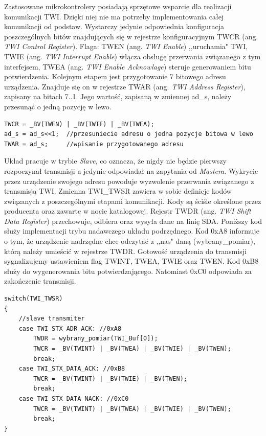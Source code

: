 Zastosowane mikrokontrolery posiadają sprzętowe wsparcie dla realizacji komunikacji TWI. Dzięki niej nie ma potrzeby implementowania całej komunikacji od podstaw. Wystarczy jedynie odpowiednia konfiguracja poszczególnych bitów znajdujących się w rejestrze konfiguracyjnym TWCR (ang. \textit{TWI Control Register})\cite{nota}. Flaga: TWEN (ang. \textit{TWI Enable}) ,,uruchamia" TWI, TWIE (ang. \textit{TWI Interrupt Enable}) włącza obsługę przerwania związanego z tym interfejsem, TWEA (ang. \textit{TWI Enable Acknowlage}) steruje generowaniem bitu potwierdzenia. Kolejnym etapem jest przygotowanie 7 bitowego adresu urządzenia. Znajduje się on w rejestrze TWAR (ang. \textit{TWI Address Register}), zapisany na bitach 7..1. Jego wartość, zapisaną w zmiennej ad\_s, należy przesunąć o jedną pozycję w lewo. 
\begin{lstlisting}[caption=Uruchomienie interfejsu TWI oraz przypisanie adresu urządzenia]
TWCR = _BV(TWEN) | _BV(TWIE) | _BV(TWEA);
ad_s = ad_s<<1;  //przesuniecie adresu o jedna pozycje bitowa w lewo
TWAR = ad_s;     //wpisanie przygotowanego adresu
\end{lstlisting}
Układ pracuje w trybie \textit{Slave}, co oznacza, że nigdy nie będzie pierwszy rozpoczynał transmisji a jedynie odpowiadał na zapytania od \textit{Mastera}. Wykrycie przez urządzenie swojego adresu powoduje wyzwolenie przerwania związanego z transmisją TWI. Zmienna TWI\_TWSR zawiera w sobie definicje kodów związanych z poszczególnymi etapami komunikacji. Kody są ściśle określone przez producenta oraz zawarte w nocie katalogowej\cite{nota}. Rejestr TWDR (ang. \textit{TWI Shift Data Register}) przechowuje, odbiera oraz wysyła dane na linię SDA. Poniższy kod służy implementacji trybu nadawczego układu podrzędnego. Kod 0xA8 informuje o tym, że urządzenie nadrzędne chce odczytać z ,,nas" daną (wybrany\_pomiar), którą należy umieścić w rejestrze TWDR. Gotowość urządzenia do transmisji sygnalizujemy ustawieniem flag TWINT, TWEA, TWIE oraz TWEN. Kod 0xB8 służy do wygenerowania bitu potwierdzającego. Natomiast 0xC0 odpowiada za zakończenie transmisji.
\begin{lstlisting}[caption={Fragment przerwania obsługującego komunikację TWI, który jest odpowiedzialny za wysłanie wskazanego bajtu}]
switch(TWI_TWSR)
{
	//slave transmiter
	case TWI_STX_ADR_ACK: //0xA8
		TWDR = wybrany_pomiar(TWI_Buf[0]);
		TWCR = _BV(TWINT) | _BV(TWEA) | _BV(TWIE) | _BV(TWEN);
		break;
	case TWI_STX_DATA_ACK: //0xB8
		TWCR = _BV(TWINT) | _BV(TWIE) | _BV(TWEN);
		break;
	case TWI_STX_DATA_NACK: //0xC0
		TWCR = _BV(TWINT) | _BV(TWEA) | _BV(TWIE) | _BV(TWEN);
		break;
}
\end{lstlisting}
